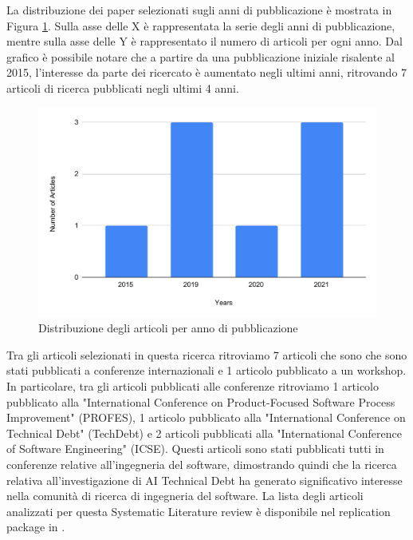  La distribuzione dei paper selezionati sugli anni di pubblicazione è mostrata in Figura \ref{fig:year_chart}.
 Sulla asse delle X è rappresentata la serie degli anni di pubblicazione, mentre sulla asse delle Y è rappresentato il numero di articoli per ogni anno.
 Dal grafico è possibile notare che a partire da una pubblicazione iniziale risalente al 2015, l'interesse da parte dei ricercato è aumentato negli ultimi anni, ritrovando 7 articoli di ricerca pubblicati negli ultimi 4 anni.
 
 \begin{figure}[h]
     \centering
     \includegraphics[width=\textwidth]{Figure/Results/SLRResults/year_chart.pdf}
     \caption{Distribuzione degli articoli per anno di pubblicazione}
     \label{fig:year_chart}
 \end{figure}

Tra gli articoli selezionati in questa ricerca ritroviamo 7 articoli che sono che sono stati pubblicati a conferenze internazionali e 1 articolo pubblicato a un workshop. 
In particolare, tra gli articoli pubblicati alle conferenze ritroviamo 1 articolo pubblicato alla "International Conference on Product-Focused Software Process Improvement" (PROFES), 1 articolo pubblicato alla "International Conference on Technical Debt" (TechDebt) e 2 articoli pubblicati alla "International Conference of Software Engineering" (ICSE). 
Questi articoli sono stati pubblicati tutti in conferenze relative all'ingegneria del software, dimostrando quindi che la ricerca relativa all'investigazione di AI Technical Debt ha generato significativo interesse nella comunità di ricerca di ingegneria del software. La lista degli articoli analizzati per questa Systematic Literature review è disponibile nel replication package in \cite{slr_rp}.


